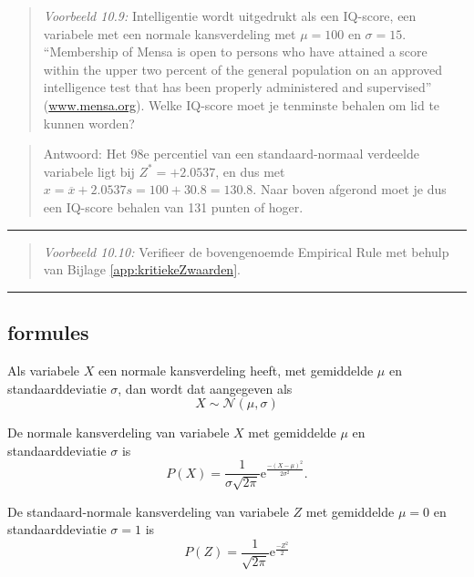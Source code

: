\documentclass[
]{book}
\begin{document}
\begin{quote}
\emph{Voorbeeld 10.9:}
Intelligentie wordt uitgedrukt als een IQ-score, een variabele met een
normale kansverdeling met \(\mu=100\) en \(\sigma=15\). ``Membership of Mensa
is open to persons who have attained a score within the upper two
percent of the general population on an approved intelligence test that
has been properly administered and supervised''
(\url{www.mensa.org}). Welke IQ-score moet je tenminste
behalen om lid te kunnen worden?
\end{quote}

\begin{quote}
Antwoord: Het 98e percentiel van een standaard-normaal verdeelde
variabele ligt bij \(Z^*=+2.0537\), en dus met
\(x=\overline{x}+2.0537 s = 100+30.8 = 130.8\). Naar boven afgerond moet
je dus een IQ-score behalen van 131 punten of hoger.
\end{quote}

\begin{center}\rule{0.5\linewidth}{0.5pt}\end{center}

\begin{quote}
\emph{Voorbeeld 10.10:}
Verifieer de bovengenoemde Empirical Rule met behulp van
Bijlage \ref{app:kritiekeZwaarden}.
\end{quote}

\begin{center}\rule{0.5\linewidth}{0.5pt}\end{center}

\hypertarget{formules-1}{%
\subsection{formules}\label{formules-1}}

Als variabele \(X\) een normale kansverdeling heeft, met gemiddelde \(\mu\)
en standaarddeviatie \(\sigma\), dan wordt dat aangegeven als
\begin{equation}
  X \sim \mathcal{N}(\mu,\sigma)
  \label{eq:normaalverdeeld}
\end{equation}

De normale kansverdeling van variabele \(X\) met gemiddelde \(\mu\) en
standaarddeviatie \(\sigma\) is
\begin{equation}
  P(X) = \frac{1}{\sigma \sqrt{2\pi}} \mbox{e}^{ \frac{-(X-\mu)^2}{2\sigma^2} }.
  \label{eq:prob-normal}
\end{equation}

De standaard-normale kansverdeling van variabele \(Z\) met gemiddelde
\(\mu=0\) en standaarddeviatie \(\sigma=1\) is
\begin{equation}
    P(Z) = \frac{1}{\sqrt{2\pi}} \mbox{e}^{ \frac{-Z^2}{2} }
  \label{eq:prob-standaardnormaal}
\end{equation}
\end{document}

